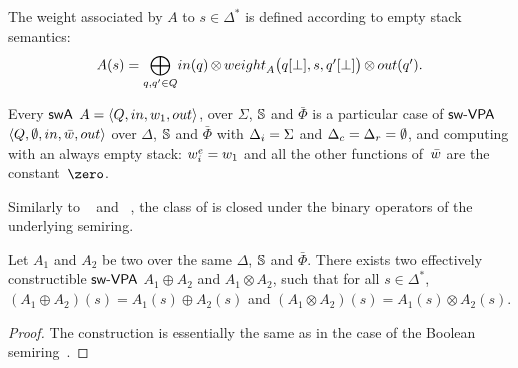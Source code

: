 %

\noindent
The weight associated by $A$ to $s \in \Delta^*$
is defined according to empty stack semantics:
%
\begin{equation}
A(s)  =
{\displaystyle\bigoplus_{q, q' \in Q}} \textstyle
\mathsf{in}(q) \mathop{\otimes}
\weight_A\bigl(\config{q}{\bot}, s, \config{q'}{\bot}\bigr)
\mathop{\otimes} \mathsf{out}(q').
\label{eq:SWVPA-value}
\end{equation}

\noindent
Every $\textsf{swA}$ $A = \< Q, \init, {\wei_1}, \final >$,
over $\Sigma$, $\mathbb{S}$ and $\bar\Phi$
is a particular case of $\textsf{sw-VPA}$
$\< Q, \emptyset, \init, \bar\wei, \final >$
over $\Delta$, $\mathbb{S}$ and $\bar\Phi$
with $\Deltai = \Sigma$ and $\Deltac = \Deltar = \emptyset$,
and computing with an always empty stack:
$\weiei = \wei_1$ and all the other functions
of~$\bar\wei$ are the constant~$\zero$.


\medskip\noindent
Similarly to \VPA~\cite{AlurMadhusudan09nested}
and \SVPA~\cite{dAntonyAlur14SVPDA},
the class of \SWVPA is closed under the binary operators of the underlying semiring.
%
\begin{proposition}\label{prop:SWVPA-product}
Let $A_1$ and $A_2$ be two \SWVPA
over the same $\Delta$, $\mathbb{S}$ and $\bar\Phi$.
There exists two effectively constructible $\textsf{sw-VPA}$
$A_1 \oplus A_2$ and $A_1 \otimes A_2$,
such that for all $s \in \Delta^*$,
$(A_1 \oplus A_2)(s) = A_1(s) \oplus A_2(s)$ and
$(A_1 \otimes A_2)(s) = A_1(s) \otimes A_2(s)$.
\end{proposition}
%
\begin{proof}
The construction is essentially the same
as in the case of the Boolean semiring~\cite{dAntonyAlur14SVPDA}.
\end{proof}

